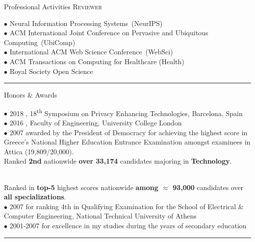 \documentclass[12pt]{resume}
\begin{document}
\begin{category}{Professional Activities}
\citemnobullet
\textsc{Reviewer}

$\bullet$ Neural Information Processing Systems~(NeurIPS)\\
$\bullet$ ACM International Joint Conference on Pervasive and Ubiquitous \mbox{Computing~(UbiComp)}\\
$\bullet$ International ACM Web Science Conference~(WebSci)\\
$\bullet$ ACM Transactions on Computing for Healthcare (Health)\\
$\bullet$  Royal Society Open Science

\noindent\rule{\textwidth}{0.2pt}
\end{category}


\newcommand{\ts}{\textsuperscript}




\begin{category}{Honors \& Awards}


$\bullet$ 2018 , 18\ts{th} Symposium on Privacy Enhancing Technologies, Barcelona, Spain \\

$\bullet$ 2016 , Faculty of Engineering, University College London \\

$\bullet$ 2007  awarded by the President of Democracy for achieving the highest score in Greece's National
Higher Education Entrance Examination amongst examinees in Attica (19,809/20,000).
\\ Ranked \textbf{2nd} nationwide \textbf{over 33,174} candidates majoring in \textbf{Technology}.

 \\ Ranked in \textbf{top-5} highest scores nationwide \textbf{among $\approx$ 93,000} candidates over \textbf{all specializations}.\\

$\bullet$ 2007  for ranking 4th in Qualifying Examination
for the School of Electrical \& Computer Engineering, National Technical University of Athens \\

$\bullet$ 2001-2007  for excellence in my studies during the years of secondary education \\

\noindent\rule{\textwidth}{0.2pt}
\end{category}
\end{document}
